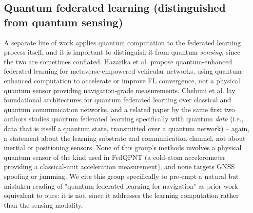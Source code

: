 \documentclass[journal]{IEEEtran}
\begin{document}
\subsection{Quantum federated learning (distinguished from quantum sensing)}
A separate line of work applies quantum computation to the federated learning process itself, and it is
important to distinguish it from quantum \emph{sensing}, since the two are sometimes conflated. Hazarika
et al. \cite{hazarika2025quantum} propose quantum-enhanced federated learning for metaverse-empowered
vehicular networks, using quantum-enhanced computation to accelerate or improve FL convergence, not a
physical quantum sensor providing navigation-grade measurements. Chehimi et al.
\cite{chehimi2023foundations} lay foundational architectures for quantum federated learning over
classical and quantum communication networks, and a related paper by the same first two authors
\cite{chehimi2022quantum} studies quantum federated learning specifically with quantum \emph{data}
(i.e., data that is itself a quantum state, transmitted over a quantum network) -- again, a statement
about the learning substrate and communication channel, not about inertial or positioning sensors. None
of this group's methods involves a physical quantum sensor of the kind used in FedQPNT (a cold-atom
accelerometer providing a classical-unit acceleration measurement), and none targets GNSS spoofing or
jamming. We cite this group specifically to pre-empt a natural but mistaken reading of "quantum
federated learning for navigation" as prior work equivalent to ours: it is not, since it addresses the
learning computation rather than the sensing modality.
\end{document}
